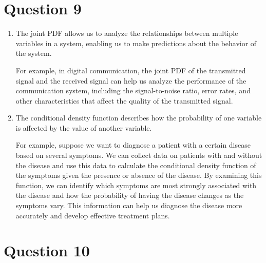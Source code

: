 \documentclass[12pt]{article}
\begin{document}
\section{Question 9}

\begin{enumerate}
    \item The joint PDF allows us to analyze the relationships between multiple variables in a system, enabling us to make predictions about the behavior of the system.\par
    For example, in digital communication, the joint PDF of the transmitted signal and the received signal can help us analyze the performance of the communication system, including the signal-to-noise ratio, error rates, and other characteristics that affect the quality of the transmitted signal.
    \item The conditional density function describes how the probability of one variable is affected by the value of another variable. \par
    For example, suppose we want to diagnose a patient with a certain disease based on several symptoms. We can collect data on patients with and without the disease and use this data to calculate the conditional density function of the symptoms given the presence or absence of the disease. 
    By examining this function, we can identify which symptoms are most strongly associated with the disease and how the probability of having the disease changes as the symptoms vary. This information can help us diagnose the disease more accurately and develop effective treatment plans.
\end{enumerate}

\section{Question 10}
\end{document}
